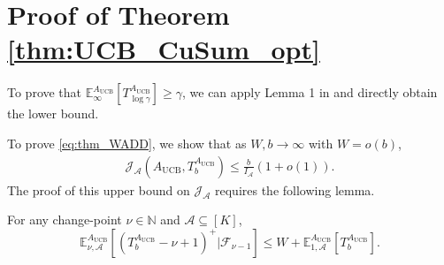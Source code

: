 \documentclass[letterpaper, 10 pt, conference]{ieeeconf}  %
\newcommand{\lp}{\left(}
\newcommand{\rp}{\right)}
\newcommand{\lb}{\left[}
\newcommand{\rb}{\right]}
\newcommand{\mcal}{\mathcal}
\newcommand{\mrm}{\mathrm}
\newcommand{\mbb}{\mathbb}
\newcommand{\E}{\mathbb{E}}
\begin{document}



\newpage
\onecolumn
\appendix
\section{Proof of Theorem \ref{thm:UCB_CuSum_opt}} \label{sec:thm1}

To prove that $\E_{\infty}^{A_{\mrm{UCB}}} \lb T_{\log \gamma}^{A_{\mrm{UCB}}} \rb \geq \gamma$, we can apply Lemma 1 in \cite{veeravalli2024quickest} and directly obtain the lower bound.

To prove \eqref{eq:thm_WADD}, we show that as $W, b \to \infty$ with $W = o(b)$,
%
\begin{align}\label{eq:UCB_CuSum_WADD_upp}
\mcal{J}_{\mcal{A}} \lp A_{\mrm{UCB}}, T_{b}^{A_{\mrm{UCB}}} \rp \leq \frac{b}{I_{\mcal{A}}}\lp 1 + o \lp 1 \rp \rp.
\end{align}
%
The proof of this upper bound on $\mcal{J}_{\mcal{A}}$ requires the following lemma.

\begin{lemma}\label{lem:nu_to_one}
For any change-point $\nu \in \mbb{N}$ and $\mcal{A} \subseteq \lb K \rb$,
\begin{equation}\label{eq:lem1}
    \E_{\nu,\mcal{A}}^{A_{\mrm{UCB}}} \lb \lp T_{b}^{A_{\mrm{UCB}}} - \nu + 1\rp^{+} \Big| \mcal{F}_{\nu-1} \rb \leq W + \E_{1,\mcal{A}}^{A_{\mrm{UCB}}} \lb T_{b}^{A_{\mrm{UCB}}} \rb.
\end{equation}
\end{lemma}
\end{document}

